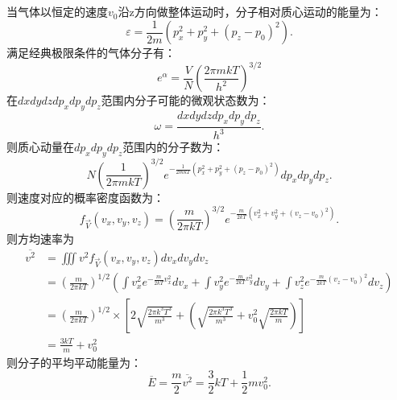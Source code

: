 \documentclass[a4paper,12pt]{article}
\begin{document}
\section{}
当气体以恒定的速度$v_0$沿z方向做整体运动时，分子相对质心运动的能量为：
\begin{equation}\nonumber
	\varepsilon = \frac{1}{2m}\left( p_x^2+p_y^2+(p_z-p_0)^2 \right).
\end{equation}
满足经典极限条件的气体分子有：
\begin{equation}\nonumber
	e^{\alpha} = \frac{V}{N}\left( \frac{2\pi mkT}{h^2} \right)^{3/2}
\end{equation}
在$dx dy dz dp_x dp_y dp_z$范围内分子可能的微观状态数为：
\begin{equation}\nonumber
	\omega = \frac{dx dy dz dp_x dp_y dp_z}{h^3}.
\end{equation}
则质心动量在$dp_x dp_y dp_z$范围内的分子数为：
\begin{equation}\nonumber
	N \left( \frac{1}{2\pi mkT} \right)^{3/2} e^{-\frac{1}{2mkT}\left( p_x^2+p_y^2+(p_z-p_0)^2 \right)}dp_x dp_y dp_z.
\end{equation}
则速度对应的概率密度函数为：
\begin{equation}\nonumber
	f_{\vec{V}}(v_x,v_y,v_z) = \left( \frac{m}{2\pi kT} \right)^{3/2} e^{-\frac{m}{2kT}\left( v_x^2+v_y^2+(v_z-v_0)^2 \right)}.
\end{equation}
则方均速率为
\begin{equation}\nonumber
\begin{aligned}
	\overline{v^2} &= \iiint v^2 f_{\vec{V}}(v_x,v_y,v_z) dv_x dv_y dv_z \\
	&= \left( \frac{m}{2\pi kT} \right)^{1/2} \left( \int v_x^2 e^{-\frac{m}{2kT}v_x^2} dv_x + \int v_y^2 e^{-\frac{m}{2kT}v_y^2} dv_y + \int v_z^2 e^{-\frac{m}{2kT}(v_z - v_0)^2} dv_z \right) \\
	&= \left( \frac{m}{2\pi kT} \right)^{1/2} \times \left[ 2\sqrt{\frac{2\pi k^3T^3}{m^3}} + \left( \sqrt{\frac{2\pi k^3T^3}{m^3}} + v_0^2\sqrt{\frac{2\pi kT}{m}} \right)\right] \\
	&= \frac{3kT}{m} + v_0^2
\end{aligned}
\end{equation}
则分子的平均平动能量为：
\begin{equation}\nonumber
	\overline{E} = \frac{m}{2}\overline{v^2} = \frac{3}{2}kT+\frac{1}{2}mv_0^2.
\end{equation}
\end{document}
